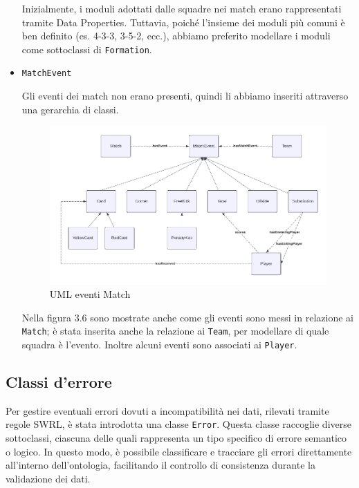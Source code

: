\documentclass[11pt]{report} %
\begin{document}
\begin{itemize}[leftmargin=*]
    Inizialmente, i moduli adottati dalle squadre nei match erano rappresentati tramite Data Properties. Tuttavia, poiché l’insieme dei moduli più comuni è ben definito (es. 4-3-3, 3-5-2, ecc.), abbiamo preferito modellare i moduli come sottoclassi di \texttt{Formation}.

    \item \texttt{MatchEvent}
    
    Gli eventi dei match non erano presenti, quindi li abbiamo inseriti attraverso una gerarchia di classi.

    \begin{figure} [h]
        \centering
        \includegraphics[width=\textwidth]{MATCHEVENT.png}
        \caption{UML eventi Match}
    \end{figure}

    Nella figura 3.6 sono mostrate anche come gli eventi sono messi in relazione ai \texttt{Match}; è stata inserita anche la relazione ai \texttt{Team}, per modellare di quale squadra è l'evento. Inoltre alcuni eventi sono associati ai \texttt{Player}. 

\end{itemize}

\newpage
\subsection{Classi d'errore}
Per gestire eventuali errori dovuti a incompatibilità nei dati, rilevati tramite regole SWRL, è stata introdotta una classe \texttt{Error}. Questa classe raccoglie diverse sottoclassi, ciascuna delle quali rappresenta un tipo specifico di errore semantico o logico. In questo modo, è possibile classificare e tracciare gli errori direttamente all’interno dell’ontologia, facilitando il controllo di consistenza durante la validazione dei dati.
\end{document}
